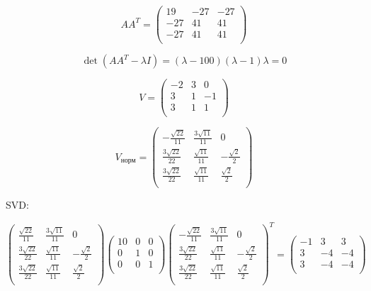 \documentclass[a4paper,12pt]{article}
\begin{document}
\[
AA^T = \begin{pmatrix}
    19 & -27 & -27 \\
    -27 & 41 & 41 \\
    -27 & 41 & 41 \\
\end{pmatrix}
\]

\[
\det(AA^T-\lambda I) = (\lambda-100)(\lambda-1)\lambda = 0
\]

\[
V = \begin{pmatrix}
    -2 & 3 & 0 \\
    3 & 1 & -1 \\
    3 & 1 & 1 \\
\end{pmatrix}
\]

\[
V_{\text{норм}} = \begin{pmatrix}
    -\frac{\sqrt{22}}{11} & \frac{3\sqrt{11}}{11} & 0 \\
    \frac{3\sqrt{22}}{22} & \frac{\sqrt{11}}{11} & -\frac{\sqrt{2}}{2} \\
    \frac{3\sqrt{22}}{22} & \frac{\sqrt{11}}{11} & \frac{\sqrt{2}}{2} \\
\end{pmatrix}
\]

SVD:

\[
\begin{pmatrix}
    \frac{\sqrt{22}}{11} & \frac{3\sqrt{11}}{11} & 0 \\
    \frac{3\sqrt{22}}{22} & \frac{\sqrt{11}}{11} & -\frac{\sqrt{2}}{2} \\
    \frac{3\sqrt{22}}{22} & \frac{\sqrt{11}}{11} & \frac{\sqrt{2}}{2} \\
\end{pmatrix} \begin{pmatrix}
    10 & 0 & 0 \\
    0 & 1 & 0 \\
    0 & 0 & 1 \\
\end{pmatrix} \begin{pmatrix}
    -\frac{\sqrt{22}}{11} & \frac{3\sqrt{11}}{11} & 0 \\
    \frac{3\sqrt{22}}{22} & \frac{\sqrt{11}}{11} & -\frac{\sqrt{2}}{2} \\
    \frac{3\sqrt{22}}{22} & \frac{\sqrt{11}}{11} & \frac{\sqrt{2}}{2} \\
\end{pmatrix}^T = \begin{pmatrix}
    -1 & 3 & 3 \\
    3 & -4 & -4 \\
    3 & -4 & -4 \\
\end{pmatrix}
\]
\end{document}
